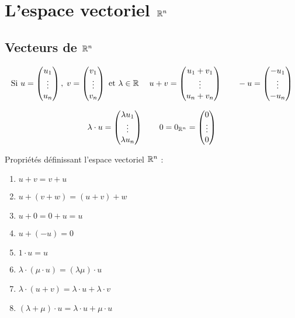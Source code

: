 \documentclass[10pt,class=article,crop=false]{standalone}
\begin{document}
\section{L'espace vectoriel $\mathbb{R}^n$}

\begin{multicols}{2}
	
\subsection{Vecteurs de $\mathbb{R}^n$}

\[
\text{Si }
u = \begin{pmatrix} u_1 \\ \vdots \\ u_n \end{pmatrix} 
, \;
v = \begin{pmatrix} v_1 \\ \vdots \\ v_n \end{pmatrix} 
\text{ et }
\lambda \in \mathbb{R} \; \quad
u + v = \begin{pmatrix}u_1 + v_1 \\ \vdots \\ u_n + v_n\end{pmatrix} 
\qquad
-u = \begin{pmatrix} -u_1\\ \vdots \\ -u_n \end{pmatrix}\]

\[
\lambda \cdot u = \begin{pmatrix}\lambda u_1 \\ \vdots \\ \lambda u_n \end{pmatrix} 
\qquad
0 = 0_{\mathbb{R}^n} = \begin{pmatrix} 0 \\ \vdots \\ 0 \end{pmatrix}
\]

Propriétés définissant l'espace vectoriel $\mathbb{R}^n$ :
\begin{enumerate}
	\item $u + v = v + u$
	\item $u + (v+w) = (u+v) +w$
	\item $u + 0 = 0 + u = u$
	\item $u + (-u) = 0$
	\item $1 \cdot u = u$
	\item $\lambda \cdot (\mu \cdot u) = (\lambda\mu )\cdot u$
	\item $\lambda \cdot (u+v) = \lambda \cdot u + \lambda \cdot v$
	\item $(\lambda + \mu ) \cdot u = \lambda \cdot u + \mu \cdot u$
\end{enumerate} 



\end{multicols}
\end{document}
